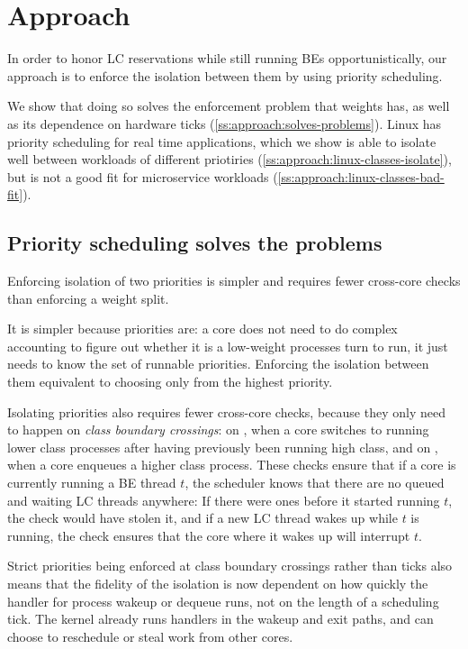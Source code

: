 \section{Approach}\label{s:approach}

In order to honor LC reservations while still running BEs opportunistically, our
approach is to enforce the isolation between them by using priority scheduling.

We show that doing so solves the enforcement problem that weights has, as well
as its dependence on hardware ticks (\autoref{ss:approach:solves-problems}).
Linux has priority scheduling for real time applications, which we show is able
to isolate well between workloads of different priotiries
(\autoref{ss:approach:linux-classes-isolate}), but is not a good fit for
microservice workloads (\autoref{ss:approach:linux-classes-bad-fit}).

\subsection{Priority scheduling solves the problems}\label{ss:approach:solves-problems}

Enforcing isolation of two priorities is simpler and requires fewer cross-core
checks than enforcing a weight split. 

It is simpler because priorities are: a core does not need to do complex
accounting to figure out whether it is a low-weight processes turn to run, it
just needs to know the set of runnable priorities. Enforcing the isolation
between them equivalent to choosing only from the highest priority.

Isolating priorities also requires fewer cross-core checks, because they only
need to happen on \textit{class boundary crossings}: on \exit{}, when a core
switches to running lower class processes after having previously been running
high class, and on \entry{}, when a core enqueues a higher class process. These
checks ensure that if a core is currently running a BE thread $t$, the scheduler
knows that there are no queued and waiting LC threads anywhere: If there were
ones before it started running $t$, the \exit{} check would have stolen it, and
if a new LC thread wakes up while $t$ is running, the \entry{} check ensures
that the core where it wakes up will interrupt $t$.

Strict priorities being enforced at class boundary crossings rather than ticks
also means that the fidelity of the isolation is now dependent on how quickly
the handler for process wakeup or dequeue runs, not on the length of a
scheduling tick. The kernel already runs handlers in the wakeup and exit paths,
and can choose to reschedule or steal work from other cores. 


